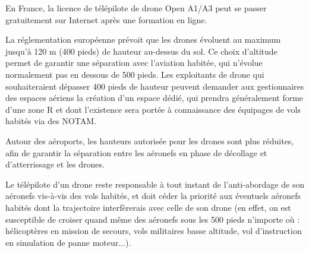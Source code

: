 En France, la licence de télépilote de drone Open A1/A3 peut se passer gratuitement sur Internet après une formation en ligne.

La réglementation européenne prévoit que les drones évoluent au maximum jusqu'à 120 m (400 pieds) de hauteur au-dessus du sol. Ce choix d'altitude permet de garantir une séparation avec l'aviation habitée, qui n'évolue normalement pas en dessous de 500 pieds. Les exploitants de drone qui souhaiteraient dépasser 400 pieds de hauteur peuvent demander aux gestionnaires des espaces aériens la création d'un espace dédié, qui prendra généralement forme d'une zone R et dont l'existence sera portée à connaissance des équipages de vols habités via des NOTAM.

Autour des aéroports, les hauteurs autorisée pour les drones sont plus réduites, afin de garantir la séparation entre les aéronefs en phase de décollage et d'atterrissage et les drones.

Le télépilote d'un drone reste responsable à tout instant de l'anti-abordage de son aéronefs vis-à-vis des vols habités, et doit céder la priorité aux éventuels aéronefs habités dont la trajectoire interfèrerais avec celle de son drone (en effet, on est susceptible de croiser quand même des aéronefs sous les 500 pieds n'importe où : hélicoptères en mission de secours, vols militaires basse altitude, vol d'instruction en simulation de panne moteur...).